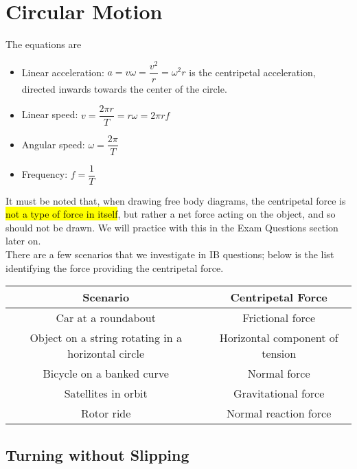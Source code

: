 \documentclass[a4paper,12pt]{article}
\let\oldsection\section
\renewcommand\section{\clearpage\oldsection}
\newcommand{\lb}{\\[8pt]}
\begin{document}
\pagebreak

\section{Circular Motion}

The equations are
\begin{itemize}
  \item Linear acceleration: $a = v\omega = \dfrac{v^2}{r} = \omega^2r$ is the centripetal acceleration, directed inwards towards the center of the circle.
  \item Linear speed: $v = \dfrac{2\pi r}{T} = r\omega = 2\pi r f$
  \item Angular speed: $\omega = \dfrac{2\pi}{T}$
  \item Frequency: $f = \dfrac{1}{T}$
\end{itemize}

It must be noted that, when drawing free body diagrams, the centripetal force is \hl{not a type of force in itself}, but rather a net force acting on the object, and so should not be drawn. We will practice with this in the Exam Questions section later on.\lb
There are a few scenarios that we investigate in IB questions; below is the list identifying the force providing the centripetal force.
\begin{table}[H]
  \centering
  \begin{tabular}{|c|c|}
    \hline
    \rowcolor{BlueGreen!35!white}
    \textbf{Scenario}                                  & \textbf{Centripetal Force}      \\ \hline
    Car at a roundabout                                & Frictional force                \\
    Object on a string rotating in a horizontal circle & Horizontal component of tension \\
    Bicycle on a banked curve                          & Normal force                    \\
    Satellites in orbit                                & Gravitational force             \\
    Rotor ride                                         & Normal reaction force           \\\hline
  \end{tabular}
\end{table}

\pagebreak


\subsection{Turning without Slipping}
\end{document}
